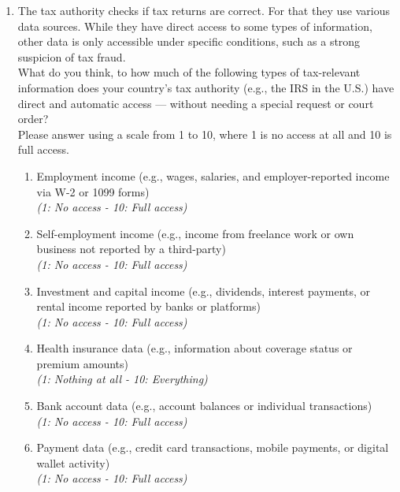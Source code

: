 \documentclass[11pt]{article}
\begin{document}
\vspace{1em}

\begin{enumerate}[resume]
    \item The tax authority checks if tax returns are correct. For that they use various data sources. While they have direct access to some types of information, other data is only accessible under specific conditions, such as a strong suspicion of tax fraud.\\
    What do you think, to how much of the following types of tax-relevant information does your country’s tax authority (e.g., the IRS in the U.S.) have direct and automatic access — without needing a special request or court order? \\ 
    Please answer using a scale from 1 to 10, where 1 is no access at all and 10 is full access.
    \begin{enumerate}[label=\alph*)]
        \item Employment income (e.g., wages, salaries, and employer-reported income via W-2 or 1099 forms) \\ \textit{(1: No access - 10: Full access)}
        \item Self-employment income (e.g., income from freelance work or own business not reported by a third-party) \\ \textit{(1: No access - 10: Full access)}
        \item Investment and capital income (e.g., dividends, interest payments, or rental income reported by banks or platforms) \\ \textit{(1: No access - 10: Full access)}
        \item Health insurance data (e.g., information about coverage status or premium amounts) \\ \textit{(1: Nothing at all - 10: Everything)}
        \item Bank account data (e.g., account balances or individual transactions) \\ \textit{(1: No access - 10: Full access)}
        \item Payment data (e.g., credit card transactions, mobile payments, or digital wallet activity) \\ \textit{(1: No access - 10: Full access)}
    \end{enumerate}
\end{enumerate}
\end{document}
